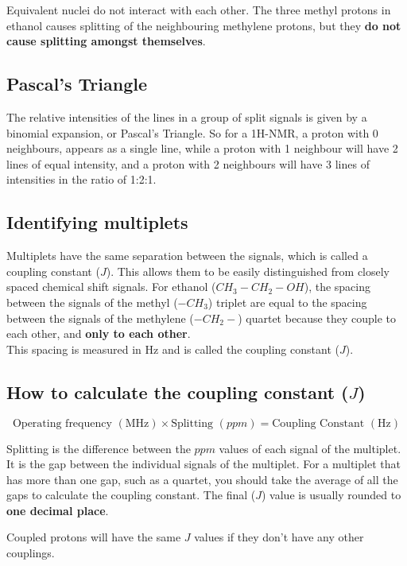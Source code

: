 \documentclass[11pt]{article}
\begin{document}
Equivalent nuclei do not interact with each other. The three methyl protons in ethanol causes splitting of the neighbouring methylene protons, but they \textbf{do not cause splitting amongst themselves}.

\subsection{Pascal's Triangle}
\label{sec:orgaee5b57}
The relative intensities of the lines in a group of split signals is given by a binomial expansion, or Pascal's Triangle. So for a 1H-NMR, a proton with 0 neighbours, appears as a single line, while a proton with 1 neighbour will have 2 lines of equal intensity, and a proton with 2 neighbours will have 3 lines of intensities in the ratio of 1:2:1.

\subsection{Identifying multiplets}
\label{sec:org0eb0ad5}
Multiplets have the same separation between the signals, which is called a coupling constant (\(J\)). This allows them to be easily distinguished from closely spaced chemical shift signals. For ethanol (\(CH_3 - CH_2 - OH\)), the spacing between the signals of the methyl (\(-CH_3\)) triplet are equal to the spacing between the signals of the methylene (\(-CH_2-\)) quartet because they couple to each other, and \textbf{only to each other}.
\\[0pt]

This spacing is measured in \(\si{\hertz}\) and is called the coupling constant (\(J\)).

\subsection{How to calculate the coupling constant (\(J\))}
\label{sec:orgc91c1fb}
\[\text{Operating frequency } (\si{\mega\hertz}) \times \text{Splitting } (\si{ppm}) = \text{Coupling Constant } (\si{\hertz})\]

Splitting is the difference between the \(\si{ppm}\) values of each signal of the multiplet. It is the gap between the individual signals of the multiplet. For a multiplet that has more than one gap, such as a quartet, you should take the average of all the gaps to calculate the coupling constant. The final (\(J\)) value is usually rounded to \textbf{one decimal place}.

Coupled protons will have the same \(J\) values if they don't have any other couplings.
\end{document}
